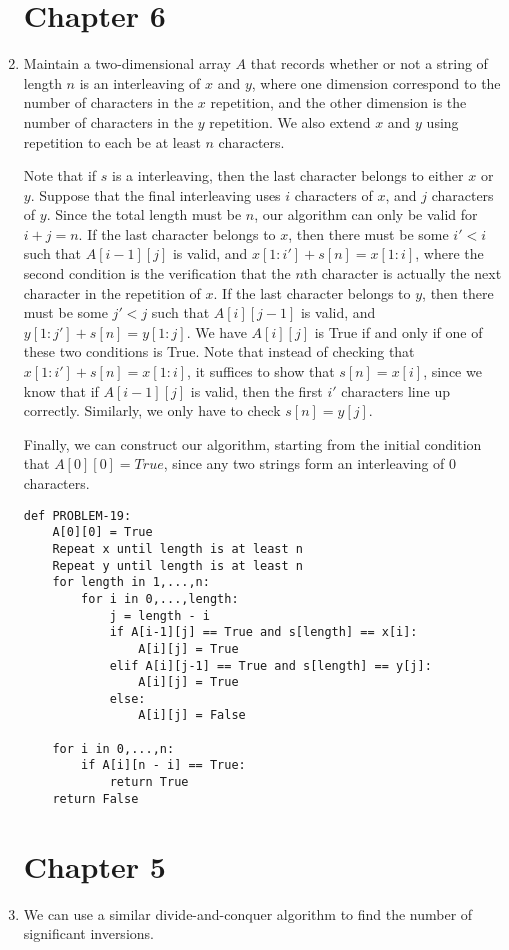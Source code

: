 \documentclass[oneside, 12pt]{article}
\begin{document}
\begin{enumerate}
\section*{Chapter 6}
\setcounter{enumi}{18}
\item
Maintain a two-dimensional array $A$ that records whether or not a string of length $n$ is an interleaving of $x$ and $y$, where one dimension correspond to the number of characters in the $x$ repetition, and the other dimension is the number of characters in the $y$ repetition. We also extend $x$ and $y$ using repetition to each be at least $n$ characters. 

Note that if $s$ is a interleaving, then the last character belongs to either $x$ or $y$. Suppose that the final interleaving uses $i$ characters of $x$, and $j$ characters of $y$. Since the total length must be $n$, our algorithm can only be valid for $i + j = n$. If the last character belongs to $x$, then there must be some $i' < i$ such that $A[i-1][j]$ is valid, and $x[1:i'] + s[n] = x[1:i]$, where the second condition is the verification that the $n$th character is actually the next character in the repetition of $x$. If the last character belongs to $y$, then there must be some $j' < j$ such that $A[i][j-1]$ is valid, and $y[1:j'] + s[n] = y[1:j]$. We have $A[i][j]$ is True if and only if one of these two conditions is True. Note that instead of checking that $x[1:i'] + s[n] = x[1:i]$, it suffices to show that $s[n] = x[i]$, since we know that if $A[i-1][j]$ is valid, then the first $i'$ characters line up correctly. Similarly, we only have to check $s[n] = y[j]$. 

Finally, we can construct our algorithm, starting from the initial condition that $A[0][0] = True$, since any two strings form an interleaving of 0 characters.

\begin{lstlisting}
def PROBLEM-19:
	A[0][0] = True
	Repeat x until length is at least n
	Repeat y until length is at least n
	for length in 1,...,n:
		for i in 0,...,length:
			j = length - i
			if A[i-1][j] == True and s[length] == x[i]:
				A[i][j] = True
			elif A[i][j-1] == True and s[length] == y[j]:
				A[i][j] = True
			else:
				A[i][j] = False

	for i in 0,...,n:
		if A[i][n - i] == True:
			return True
	return False
\end{lstlisting}
\clearpage
\section*{Chapter 5}
\setcounter{enumi}{1}
\item
We can use a similar divide-and-conquer algorithm to find the number of significant inversions.


\end{enumerate}
\end{document}
